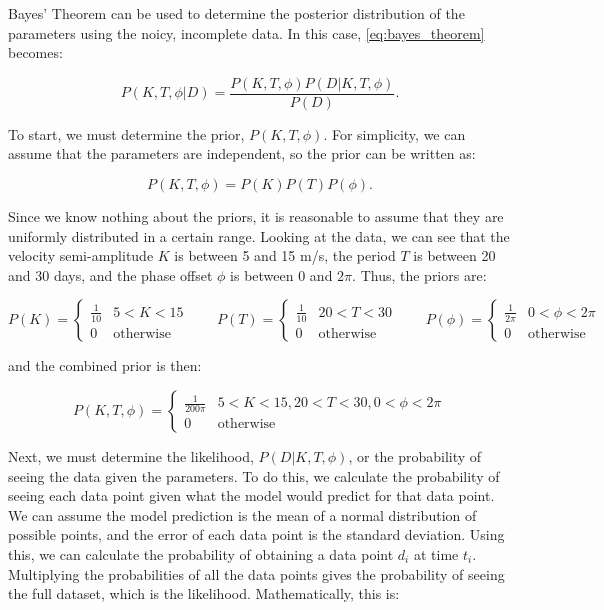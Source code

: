 \documentclass[preprint,longauthor]{aastex631}
\numberwithin{equation}{section}
\begin{document}
Bayes' Theorem can be used to determine the posterior distribution of the parameters using the noicy, incomplete data. In this case, \autoref{eq:bayes_theorem} becomes:

\begin{equation}
  P(K,T,\phi|D) = \frac{P(K,T,\phi)P(D|K,T,\phi)}{P(D)}.
\end{equation}

To start, we must determine the prior, $P(K,T,\phi)$. For simplicity, we can assume that the parameters are independent, so the prior can be written as:

\begin{equation}
  P(K,T,\phi) = P(K)P(T)P(\phi).
\end{equation}

Since we know nothing about the priors, it is reasonable to assume that they are uniformly distributed in a certain range. Looking at the data, we can see that the velocity semi-amplitude $K$ is between 5 and 15 m/s, the period $T$ is between 20 and 30 days, and the phase offset $\phi$ is between 0 and $2\pi$. Thus, the priors are:

\begin{equation*}
  P(K) = \begin{cases}
    \frac{1}{10} & 5 < K < 15 \\
    0 & \text{otherwise}
  \end{cases} \qquad
  P(T) = \begin{cases}
    \frac{1}{10} & 20 < T < 30 \\
    0 & \text{otherwise}
  \end{cases} \qquad
  P(\phi) = \begin{cases}
    \frac{1}{2\pi} & 0 < \phi < 2\pi \\
    0 & \text{otherwise}
  \end{cases}
\end{equation*}

and the combined prior is then:

\begin{equation}
  P(K,T,\phi) = \begin{cases}
    \frac{1}{200\pi} & 5 < K < 15, 20 < T < 30, 0 < \phi < 2\pi \\
    0 & \text{otherwise}
  \end{cases}
\end{equation}

Next, we must determine the likelihood, $P(D|K,T,\phi)$, or the probability of seeing the data given the parameters. To do this, we calculate the probability of seeing each data point given what the model would predict for that data point. We can assume the model prediction is the mean of a normal distribution of possible points, and the error of each data point is the standard deviation. Using this, we can calculate the probability of obtaining a data point $d_i$ at time $t_i$. Multiplying the probabilities of all the data points gives the probability of seeing the full dataset, which is the likelihood. Mathematically, this is:
\end{document}
